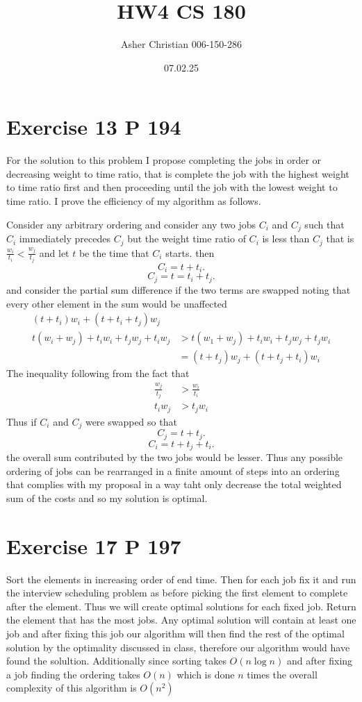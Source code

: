 \documentclass{amsart}
\title{HW4 CS 180}
\author{Asher Christian 006-150-286}
\date{ 07.02.25}
\begin{document}
\maketitle

\section{Exercise 13 P 194}
For the solution to this problem I propose completing the jobs in order
or decreasing weight to time ratio, that is complete the job with the highest weight to time ratio first and then proceeding until the
job with the lowest weight to time ratio. I prove the efficiency of my algorithm as follows.

Consider any arbitrary ordering and consider any two jobs $C_i$ and $C_j$ such that $C_i$ immediately precedes
$C_j$ but the weight time ratio of $C_i$ is less than $C_j$ that is $\frac{w_i}{t_i}  < \frac{w_j}{t_j}$ and let  $t$ be the time that $C_i$ starts. 
then
\[
C_i = t + t_i
.\] 
\[
C_j = t = t_i + t_j
.\] 
and consider the partial sum difference if the two terms are swapped noting that every other element in the sum would be unaffected
\begin{align*}
    (t+t_i)w_i + (t+t_i + t_j)w_j\\
    t(w_i + w_j) + t_iw_i + t_jw_j + t_iw_j &> t(w_1+w_j) + t_iw_i + t_jw_j + t_jw_i\\
                                              &= (t+t_j)w_j + (t + t_j + t_i)w_i
\end{align*}
The inequality following from the fact that
\begin{align*}
    \frac{w_j}{t_j} &> \frac{w_i}{t_i}\\
    t_iw_j &> t_jw_i
\end{align*}
Thus if $C_i$ and $C_j$ were swapped so that
\[
C_j = t + t_j
.\] 
\[
C_i = t + t_j + t_i
.\] 
the overall sum contributed by the two jobs would be lesser. Thus any possible ordering of jobs
can be rearranged in a finite amount of steps into an ordering that complies with my proposal
in a way taht only decrease the total weighted sum of the costs and so my solution is optimal.


\section{Exercise 17 P 197}
Sort the elements in increasing order of end time. Then for each job fix it and run the interview scheduling problem
as before picking the first element to complete after the element. Thus we will create optimal solutions for each fixed job. Return the element 
that has the most jobs. Any optimal solution will contain at least one job and after fixing this job our algorithm will then find the rest of the
optimal solution by the optimality discussed in class, therefore our algorithm would have found the solultion. Additionally since
sorting takes $O(n \log n)$ and after fixing a job finding the ordering takes $O(n)$ which is done $n$ times the overall
complexity of this algorithm is $O(n^2)$
\end{document}
